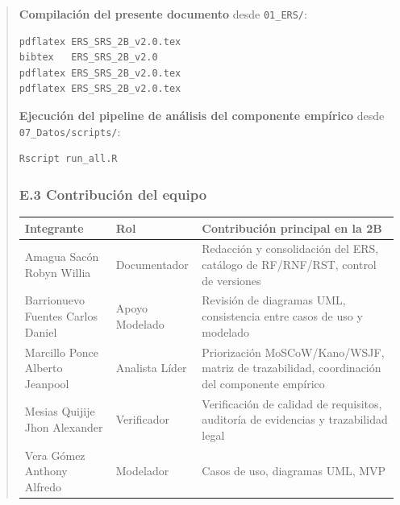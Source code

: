 \documentclass[
]{article}
\begin{document}
\begin{quote}
\noindent\textbf{Compilación del presente documento} desde \texttt{01\_ERS/}:
\begin{verbatim}
pdflatex ERS_SRS_2B_v2.0.tex
bibtex   ERS_SRS_2B_v2.0
pdflatex ERS_SRS_2B_v2.0.tex
pdflatex ERS_SRS_2B_v2.0.tex
\end{verbatim}

\noindent\textbf{Ejecución del pipeline de análisis del componente
empírico} desde \texttt{07\_Datos/scripts/}:
\begin{verbatim}
Rscript run_all.R
\end{verbatim}

\subsubsection{E.3 Contribución del equipo}\label{e3-contribucion-del-equipo}

\begin{longtable}[]{|
  >{\raggedright\arraybackslash}p{}|
  >{\raggedright\arraybackslash}p{}|
  >{\raggedright\arraybackslash}p{}|}
\hline
\begin{minipage}[b]{\linewidth}\raggedright
\textbf{Integrante}
\end{minipage} & \begin{minipage}[b]{\linewidth}\raggedright
\textbf{Rol}
\end{minipage} & \begin{minipage}[b]{\linewidth}\raggedright
\textbf{Contribución principal en la 2B}
\end{minipage} \\
\hline
\endhead
\hline
\endlastfoot
Amagua Sacón Robyn Willia & Documentador & Redacción y consolidación del ERS, catálogo de RF/RNF/RST, control de versiones \\
\hline
Barrionuevo Fuentes Carlos Daniel & Apoyo Modelado & Revisión de diagramas UML, consistencia entre casos de uso y modelado \\
\hline
Marcillo Ponce Alberto Jeanpool & Analista Líder & Priorización MoSCoW/Kano/WSJF, matriz de trazabilidad, coordinación del componente empírico \\
\hline
Mesias Quijije Jhon Alexander & Verificador & Verificación de calidad de requisitos, auditoría de evidencias y trazabilidad legal \\
\hline
Vera Gómez Anthony Alfredo & Modelador & Casos de uso, diagramas UML, MVP \\
\hline
\end{longtable}


\end{quote}
\end{document}
